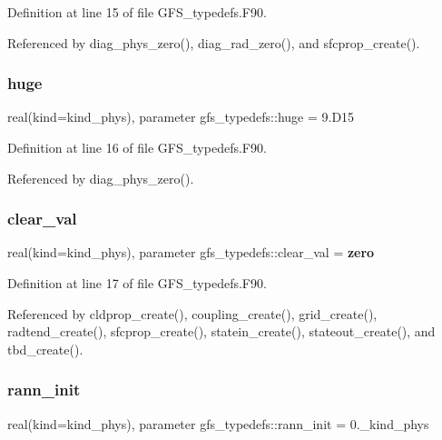 Definition at line 15 of file G\+F\+S\+\_\+typedefs.\+F90.



Referenced by diag\+\_\+phys\+\_\+zero(), diag\+\_\+rad\+\_\+zero(), and sfcprop\+\_\+create().

\mbox{\label{namespacegfs__typedefs_a3beaa525bd66ab84e50317539447515e}} 
\subsubsection{huge}
{\footnotesize\ttfamily real(kind=kind\+\_\+phys), parameter gfs\+\_\+typedefs\+::huge = 9.\+D15}



Definition at line 16 of file G\+F\+S\+\_\+typedefs.\+F90.



Referenced by diag\+\_\+phys\+\_\+zero().

\mbox{\label{namespacegfs__typedefs_a09c797072c5588e4c3aedf67cde1f310}} 
\subsubsection{clear\+\_\+val}
{\footnotesize\ttfamily real(kind=kind\+\_\+phys), parameter gfs\+\_\+typedefs\+::clear\+\_\+val = \textbf{ zero}}



Definition at line 17 of file G\+F\+S\+\_\+typedefs.\+F90.



Referenced by cldprop\+\_\+create(), coupling\+\_\+create(), grid\+\_\+create(), radtend\+\_\+create(), sfcprop\+\_\+create(), statein\+\_\+create(), stateout\+\_\+create(), and tbd\+\_\+create().

\mbox{\label{namespacegfs__typedefs_a47c92585ca7686a295065794401a4ae3}} 
\subsubsection{rann\+\_\+init}
{\footnotesize\ttfamily real(kind=kind\+\_\+phys), parameter gfs\+\_\+typedefs\+::rann\+\_\+init = 0.\+\_\+kind\+\_\+phys}



